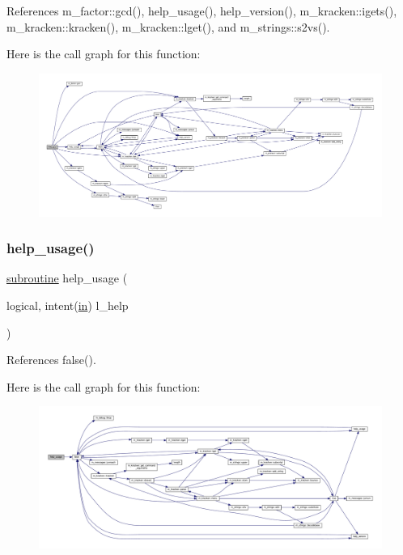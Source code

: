 References m\+\_\+factor\+::gcd(), help\+\_\+usage(), help\+\_\+version(), m\+\_\+kracken\+::igets(), m\+\_\+kracken\+::kracken(), m\+\_\+kracken\+::lget(), and m\+\_\+strings\+::s2vs().

Here is the call graph for this function\+:
\nopagebreak
\begin{figure}[H]
\begin{center}
\leavevmode
\includegraphics[width=350pt]{gcd_8f90_a38924afeefabd20962a8d2f87c2949d7_cgraph}
\end{center}
\end{figure}
\mbox{\label{gcd_8f90_a3e09a3b52ee8fb04eeb93fe5761626a8}} 
\subsubsection{\texorpdfstring{help\+\_\+usage()}{help\_usage()}}
{\footnotesize\ttfamily \hyperlink{M__stopwatch_83_8txt_acfbcff50169d691ff02d4a123ed70482}{subroutine} help\+\_\+usage (\begin{DoxyParamCaption}\item[{logical, intent(\hyperlink{M__journal_83_8txt_afce72651d1eed785a2132bee863b2f38}{in})}]{l\+\_\+help }\end{DoxyParamCaption})}



References false().

Here is the call graph for this function\+:
\nopagebreak
\begin{figure}[H]
\begin{center}
\leavevmode
\includegraphics[width=350pt]{gcd_8f90_a3e09a3b52ee8fb04eeb93fe5761626a8_cgraph}
\end{center}
\end{figure}
\mbox{\label{gcd_8f90_a39c21619b08a3c22f19e2306efd7f766}} 
